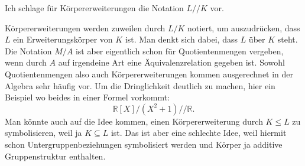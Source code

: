 \documentclass[a4paper,11pt,fleqn]{article}
\begin{document}
Ich schlage für Körpererweiterungen die Notation $L/\!/K$
vor.

Körpererweiterungen werden zuweilen durch $L/K$ notiert, um
auszudrücken, dass $L$ ein Erweiterungskörper von $K$ ist.
Man denkt sich dabei, dass $L$ über $K$ steht. Die Notation
$M/A$ ist aber eigentlich schon für Quotientenmengen vergeben,
wenn durch $A$ auf irgendeine Art eine Äquivalenzrelation
gegeben ist. Sowohl Quotientenmengen also auch Körpererweiterungen
kommen ausgerechnet in der Algebra sehr häufig vor.
Um die Dringlichkeit deutlich zu machen, hier ein Beispiel
wo beides in einer Formel vorkommt:
\begin{equation}
\mathbb R[X]/(X^2+1)/\!/\mathbb R.
\end{equation}
Man könnte auch auf die Idee kommen, einen Körpererweiterung
durch $K\le L$ zu symbolisieren, weil ja $K\subseteq L$ ist.
Das ist aber eine schlechte Idee, weil hiermit schon
Untergruppenbeziehungen symbolisiert werden und Körper ja
additive Gruppenstruktur enthalten.
\end{document}
